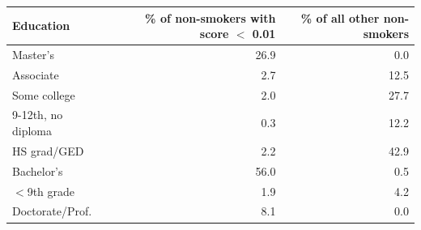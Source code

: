 {\small
\begin{tabular}{lrr}
\toprule
Education & \% of non-smokers with score $<$ 0.01 & \% of all other non-smokers \\
\midrule
Master's & 26.9 & 0.0 \\
Associate & 2.7 & 12.5 \\
Some college & 2.0 & 27.7 \\
9-12th, no diploma & 0.3 & 12.2 \\
HS grad/GED & 2.2 & 42.9 \\
Bachelor's & 56.0 & 0.5 \\
$<$9th grade & 1.9 & 4.2 \\
Doctorate/Prof. & 8.1 & 0.0 \\
\bottomrule
\end{tabular}
}
